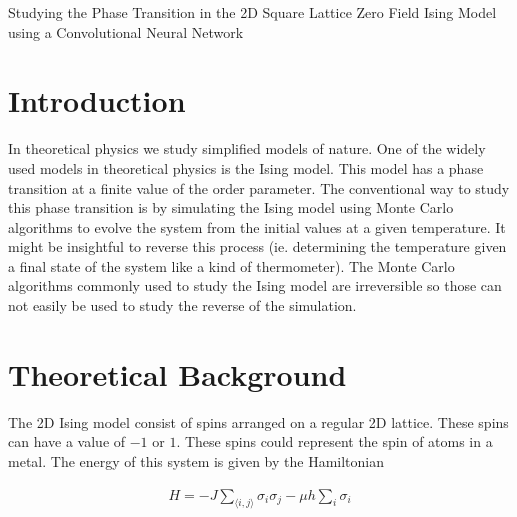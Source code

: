 \documentclass[10 pt, a4paper]{article}
\begin{document}
\begin{center}
\huge Studying the Phase Transition in the 2D Square Lattice Zero Field Ising Model using a Convolutional Neural Network \\

\end{center}

\setcounter{figure}{0}



\section{Introduction}

In theoretical physics we study simplified models of nature. One of the widely used models in theoretical physics is the Ising model. This model has a phase transition at a finite value of the order parameter. The conventional way to study this phase transition is by simulating the Ising model using Monte Carlo algorithms to evolve the system from the initial values at a given temperature. It might be insightful to reverse this process (ie. determining the temperature given a final state of the system like a kind of thermometer). The Monte Carlo algorithms commonly used to study the Ising model are irreversible so those can not easily be used to study the reverse of the simulation.

\section{Theoretical Background}

The 2D Ising model consist of spins arranged on a regular 2D lattice. These spins can have a value of $-1$ or $1$. These spins could represent the spin of atoms in a metal. The energy of this system is given by the Hamiltonian 

\begin{align}
H = -J  \sum_{\langle i,j \rangle} \sigma_i \sigma_j -  \mu h \sum_i \sigma_i
\end{align}          
\end{document}
